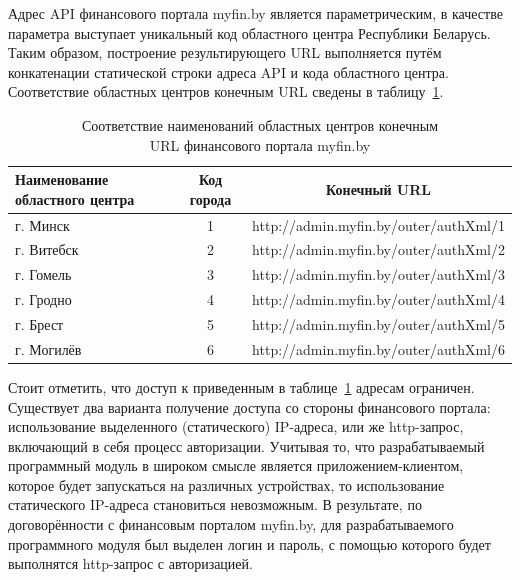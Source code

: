 Адрес API финансового портала myfin.by является параметрическим,
в качестве параметра выступает уникальный код областного центра Республики Беларусь.
Таким образом, построение результирующего URL выполняется путём конкатенации
статической строки адреса API и кода областного центра.
Соответствие областных центров конечным URL сведены в таблицу~\ref{tbl:url_by_city}.
\begin{table} [h!]
  \caption{
    Соответствие наименований областных центров конечным \\
    \hspace{29.5mm} URL финансового портала myfin.by
  }\label{tbl:url_by_city}
    \begin{tabular}{| m{4.75cm} | c | c |}
      \hline

      Наименование \newline областного центра & Код  города & Конечный URL \\
      \hline

      г. Минск    & 1 & http://admin.myfin.by/outer/authXml/1 \\ \hline
      г. Витебск  & 2 & http://admin.myfin.by/outer/authXml/2 \\ \hline
      г. Гомель   & 3 & http://admin.myfin.by/outer/authXml/3 \\ \hline
      г. Гродно   & 4 & http://admin.myfin.by/outer/authXml/4 \\ \hline
      г. Брест    & 5 & http://admin.myfin.by/outer/authXml/5 \\ \hline
      г. Могилёв  & 6 & http://admin.myfin.by/outer/authXml/6 \\ \hline

    \end{tabular}
\end{table}

Стоит отметить, что доступ к приведенным в таблице~\ref{tbl:url_by_city} адресам
ограничен. Существует два варианта получение доступа со стороны финансового портала:
использование выделенного (статического) IP-адреса, или же http-запрос,
включающий в себя процесс авторизации. Учитывая то, что разрабатываемый
программный модуль в широком смысле является приложением-клиентом,
которое будет запускаться на различных устройствах,
то использование статического IP-адреса становиться невозможным. В результате,
по договорённости с финансовым порталом myfin.by, для разрабатываемого
программного модуля был выделен логин и пароль, с помощью которого будет
выполнятся http-запрос с авторизацией.


